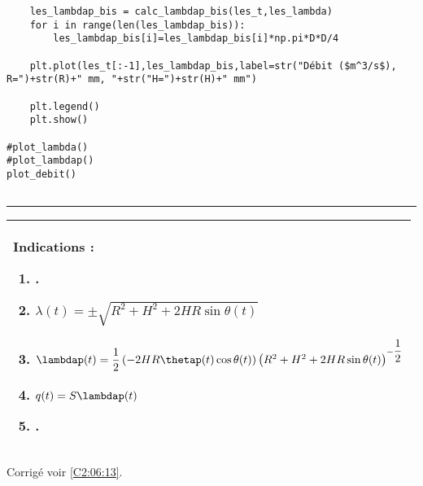 \begin{lstlisting}
    les_lambdap_bis = calc_lambdap_bis(les_t,les_lambda)
    for i in range(len(les_lambdap_bis)):
        les_lambdap_bis[i]=les_lambdap_bis[i]*np.pi*D*D/4

    plt.plot(les_t[:-1],les_lambdap_bis,label=str("Débit ($m^3/s$), R=")+str(R)+" mm, "+str("H=")+str(H)+" mm")

    plt.legend()
    plt.show()
    
#plot_lambda()
#plot_lambdap()
plot_debit()


\end{lstlisting}
\noindent\hrule

\else
\fi




\ifprof
\else
\footnotesize
\ifcolle
\else
\begin{center}
\begin{tabular}{|p{.9\linewidth}|}
\hline
Indications :
\begin{enumerate}
\item .
\item $\lambda(t) = \pm\sqrt{ R^2  +H^2 +2 HR\sin\theta(t)}$
\item $\lambdap(t) = \dfrac{1}{2}\left(-  2 HR\thetap(t)\cos\theta(t)\right)\left(R^2  +H^2 +2 HR\sin\theta(t)\right)^{-\dfrac{1}{2}}$
\item $q(t)=S\lambdap(t)$
\item .
\end{enumerate} \\ \hline
\end{tabular}
\end{center}
\fi
\normalsize
\begin{flushright}
\footnotesize{Corrigé  voir \ref{C2:06:13}.}
\end{flushright}%
\fi